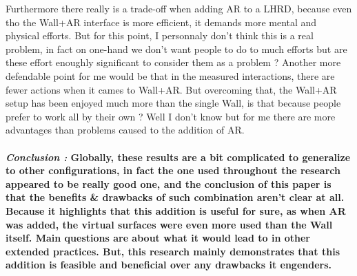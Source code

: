 {                \newline
                \indent \indent \textnormal{Furthermore there really is a trade-off when adding AR to a LHRD, because even tho the Wall+AR interface is more efficient, it demands more mental and physical efforts. But for this point, I personnaly
                don't think this is a real problem, in fact on one-hand we don't want people to do to much efforts but are these effort enoughly significant to consider them as a problem ? Another more defendable point for me 
                would be that in the measured interactions, there are fewer actions when it cames to Wall+AR. But overcoming that, the Wall+AR setup has been enjoyed much more than the single Wall, is that because people prefer to work all by their
                own ? Well I don't know but for me there are more advantages than problems caused to the addition of AR.} }

    \paragraph{ \textit{Conclusion :}
                \newline 
                \indent \indent \textnormal{Globally, these results are a bit complicated to generalize to other configurations, in fact the one used throughout the research appeared to be 
                really good one, and the conclusion of this paper is that the benefits \& drawbacks of such combination aren't clear at all. Because it highlights that this addition is useful for sure, as when AR was added, the virtual 
                surfaces were even more used than the Wall itself. Main questions are about what it would lead to in other extended practices.}
                \newline 
                \indent \indent \textnormal{But, this research mainly demonstrates that this addition is feasible and beneficial over any drawbacks it engenders.}}